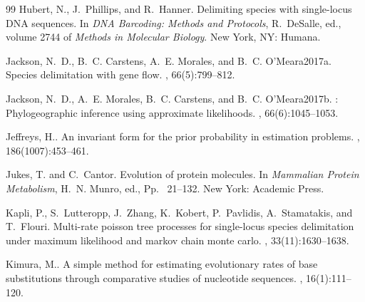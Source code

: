 \documentclass[12pt]{article}
\begin{document}
\begin{thebibliography}{99}
Hubert, N., J.~Phillips, and R.~Hanner\leavevmode\nopagebreak{}.
\newblock Delimiting species with single-locus {DNA} sequences.
\newblock In {\em DNA Barcoding: Methods and Protocols}, R.~DeSalle, ed.,
  volume 2744 of {\em Methods in Molecular Biology}.
\newblock New York, NY: Humana.

Jackson, N.~D., B.~C. Carstens, A.~E. Morales, and B.~C.
  O’Meara\leavevmode\nopagebreak\newline 2017a.
\newblock Species delimitation with gene flow.
, 66(5):799--812.

Jackson, N.~D., A.~E. Morales, B.~C. Carstens, and B.~C.
  O'Meara\leavevmode\nopagebreak\newline 2017b.
: {P}hylogeographic inference using approximate likelihoods.
, 66(6):1045--1053.

Jeffreys, H.\leavevmode\nopagebreak{}.
\newblock An invariant form for the prior probability in estimation problems.
, 186(1007):453--461.

Jukes, T. and C.~Cantor\leavevmode\nopagebreak{}.
\newblock Evolution of protein molecules.
\newblock In {\em Mammalian Protein Metabolism}, H.~N. Munro, ed., Pp.~
  21--132.
\newblock New York: Academic Press.

Kapli, P., S.~Lutteropp, J.~Zhang, K.~Kobert, P.~Pavlidis, A.~Stamatakis, and
  T.~Flouri\leavevmode\nopagebreak{}.
\newblock Multi-rate poisson tree processes for single-locus species
  delimitation under maximum likelihood and markov chain monte carlo.
, 33(11):1630--1638.

Kimura, M.\leavevmode\nopagebreak{}.
\newblock A simple method for estimating evolutionary rates of base
  substitutions through comparative studies of nucleotide sequences.
, 16(1):111--120.


\end{thebibliography}
\end{document}
